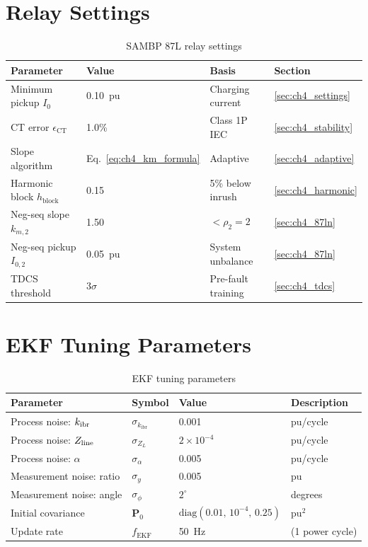 \section{Relay Settings}
\label{app:relay_settings}

\begin{table}[htbp]
\caption{SAMBP 87L relay settings}
\label{tab:app_87l}
\begin{tabularx}{\textwidth}{@{}lXXl@{}}
\toprule
Parameter & Value & Basis & Section \\
\midrule
Minimum pickup $I_0$ & 0.10~pu & Charging current & \ref{sec:ch4_settings} \\
CT error $\epsilon_\mathrm{CT}$ & 1.0\% & Class 1P IEC & \ref{sec:ch4_stability} \\
Slope algorithm & Eq.~\eqref{eq:ch4_km_formula} & Adaptive & \ref{sec:ch4_adaptive} \\
Harmonic block $h_\mathrm{block}$ & 0.15 & 5\% below inrush & \ref{sec:ch4_harmonic} \\
Neg-seq slope $k_{m,2}$ & 1.50 & $< \rho_2 = 2$ & \ref{sec:ch4_87ln} \\
Neg-seq pickup $I_{0,2}$ & 0.05~pu & System unbalance & \ref{sec:ch4_87ln} \\
TDCS threshold & $3\sigma$ & Pre-fault training & \ref{sec:ch4_tdcs} \\
\bottomrule
\end{tabularx}
\end{table}

\section{EKF Tuning Parameters}
\label{app:ekf}

\begin{table}[htbp]
\caption{EKF tuning parameters}
\label{tab:app_ekf}
\small
\begin{tabularx}{\textwidth}{@{}p{3.8cm}Xll@{}}
\toprule
Parameter & Symbol & Value & Description \\
\midrule
Process noise: $k_{\mathrm{ibr}}$ & $\sigma_{k_\mathrm{ibr}}$ & 0.001 & pu/cycle \\
Process noise: $Z_{\mathrm{line}}$ & $\sigma_{Z_L}$ & $2\times10^{-4}$ & pu/cycle \\
Process noise: $\alpha$ & $\sigma_\alpha$ & 0.005 & pu/cycle \\
Measurement noise: ratio & $\sigma_y$ & 0.005 & pu \\
Measurement noise: angle & $\sigma_\phi$ & $2^\circ$ & degrees \\
Initial covariance & $\mathbf{P}_0$ & $\mathrm{diag}(0.01,\,10^{-4},\,0.25)$ & pu$^2$ \\
Update rate & $f_\mathrm{EKF}$ & 50~Hz & (1 power cycle) \\
\bottomrule
\end{tabularx}
\end{table}

